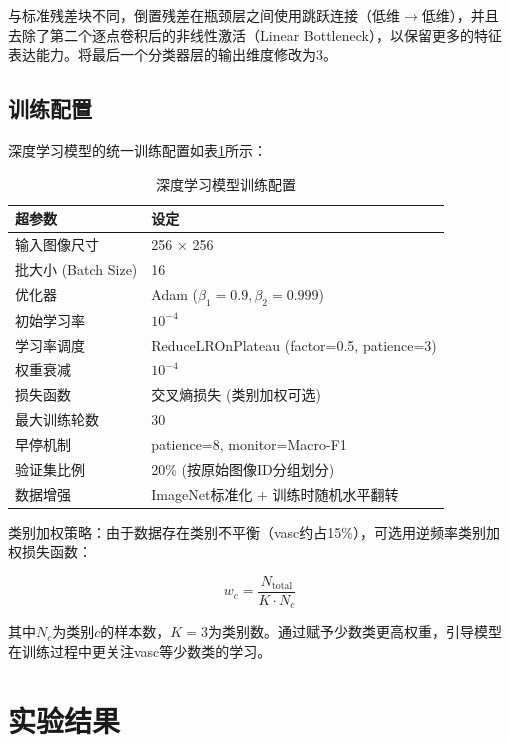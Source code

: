 \documentclass[UTF8,a4paper,12pt]{ctexart}
\numberwithin{figure}{section}
\numberwithin{table}{section}
\begin{document}
与标准残差块不同，倒置残差在瓶颈层之间使用跳跃连接（低维$\rightarrow$低维），并且去除了第二个逐点卷积后的非线性激活（Linear Bottleneck），以保留更多的特征表达能力。将最后一个分类器层的输出维度修改为3。

\subsection{训练配置}

深度学习模型的统一训练配置如表\ref{tab:dl_config}所示：

\begin{table}[H]
\centering
\caption{深度学习模型训练配置}
\label{tab:dl_config}
\begin{tabular}{ll}
\toprule
\textbf{超参数} & \textbf{设定} \\
\midrule
输入图像尺寸 & 256 × 256 \\
批大小 (Batch Size) & 16 \\
优化器 & Adam ($\beta_1=0.9, \beta_2=0.999$) \\
初始学习率 & $10^{-4}$ \\
学习率调度 & ReduceLROnPlateau (factor=0.5, patience=3) \\
权重衰减 & $10^{-4}$ \\
损失函数 & 交叉熵损失 (类别加权可选) \\
最大训练轮数 & 30 \\
早停机制 & patience=8, monitor=Macro-F1 \\
验证集比例 & 20\% (按原始图像ID分组划分) \\
数据增强 & ImageNet标准化 + 训练时随机水平翻转 \\
\bottomrule
\end{tabular}
\end{table}

类别加权策略：由于数据存在类别不平衡（vasc约占15\%），可选用逆频率类别加权损失函数：

\begin{equation}
w_c = \frac{N_{\text{total}}}{K \cdot N_c}
\end{equation}

其中$N_c$为类别$c$的样本数，$K=3$为类别数。通过赋予少数类更高权重，引导模型在训练过程中更关注vasc等少数类的学习。

\section{实验结果}\label{sec:results}
\end{document}
